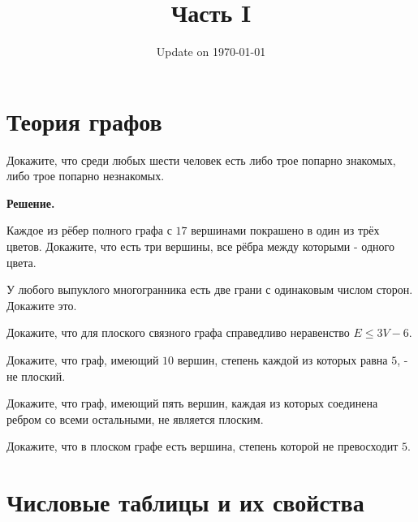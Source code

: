 \documentclass[12pt]{article}
\begin{document}
\fontsize{12}{12}\selectfont

\title{\bf \huge Часть I}
\date{Update on \today}
\maketitle 



\section*{Теория графов}

\begin{task}
Докажите, что среди любых шести человек есть либо трое попарно знакомых, либо трое попарно незнакомых.
\end{task}

\noindent\textbf{Решение.} 

\begin{task}
Каждое из рёбер полного графа с $17$ вершинами покрашено в один из трёх цветов. Докажите, что есть три вершины, все рёбра между которыми - одного цвета.
\end{task}

\begin{task}
У любого выпуклого многогранника есть две грани с одинаковым числом сторон. Докажите это.
\end{task}

\begin{task}
Докажите, что для плоского связного графа справедливо неравенство  $E \leqslant  3V - 6$.
\end{task}

\begin{task}
Докажите, что граф, имеющий $10$ вершин, степень каждой из которых равна $5$, - не плоский.    
\end{task}

\begin{task}
Докажите, что граф, имеющий пять вершин, каждая из которых соединена ребром со всеми остальными, не является плоским.
\end{task}

\begin{task}
Докажите, что в плоском графе есть вершина, степень которой не превосходит $5$. 
\end{task}




\section*{Числовые таблицы и их свойства}
\end{document}
